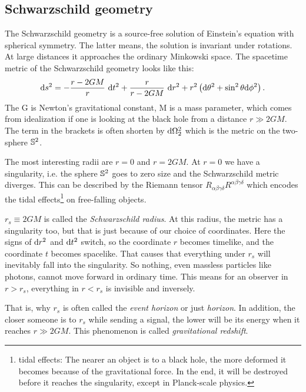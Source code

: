 \subsection{Schwarzschild geometry \checkmark}
	
	The Schwarzschild geometry is a source-free solution of Einstein's equation  with spherical symmetry. The latter means, the solution is invariant under rotations. 
	At large distances it approaches the ordinary Minkowski space.
	The spacetime metric of the Schwarzschild geometry looks like this:\\
		\begin{equation} \label{p.3 (2.1)}
		\mathrm{d} s^2=-\frac{r-2GM}{r}~ \mathrm{d} t^2+\frac{r}{r-2GM}~
		\mathrm{d} r^2+r^2 \left( \mathrm{d} \theta^2+\sin^2\theta \mathrm{d} \phi^2 \right).
		\end{equation}
	The G is Newton's gravitational constant, M is a mass parameter, which comes from idealization if one is looking at the black hole from a distance $r\gg 2GM$.
	The term in the brackets is often shorten by $\mathrm{d} \Omega_2^2$ which is the metric on the two-sphere $\mathbb{S}^2$.
	
	The most interesting radii are $r=0$ and $r=2GM$.
	At $r=0$ we have a singularity, i.e. the sphere $\mathbb{S}^2$ goes to zero size and the Schwarzschild metric diverges.
	This can be described by the Riemann tensor $R_{\alpha\beta\gamma \delta}R^{\alpha\beta\gamma\delta}$ which encodes the tidal effects\footnote{tidal effects: The nearer an object is to a black hole, the more deformed it becomes because of the gravitational force. In the end, it will be destroyed before it reaches the singularity, except in Planck-scale physics.} on free-falling objects.
	
	$r_{s}\equiv 2GM$ is called the \textit{Schwarzschild radius}. At this radius, the metric has a singularity too, but that is just because of our choice of coordinates. Here the signs of $\mathrm{d} r^2$ and $\mathrm{d} t^2$ switch, so the coordinate $r$ becomes timelike, and the coordinate $t$ becomes spacelike. That causes that everything under $r_{s}$ will inevitably fall into the singularity. 
	So nothing, even massless particles like photons, cannot move forward in ordinary time. This means for an observer in $r>r_{s}$, everything in $r<r_{s}$ is invisible and inversely. 
	
	That is, why $r_{s}$ is often called the \textit{event horizon} or just \textit{horizon}.
	In addition, the closer someone is to $r_{s}$ while sending a signal, the lower will be its energy when it reaches $r\gg 2GM$. This phenomenon is called \textit{gravitational redshift}.
